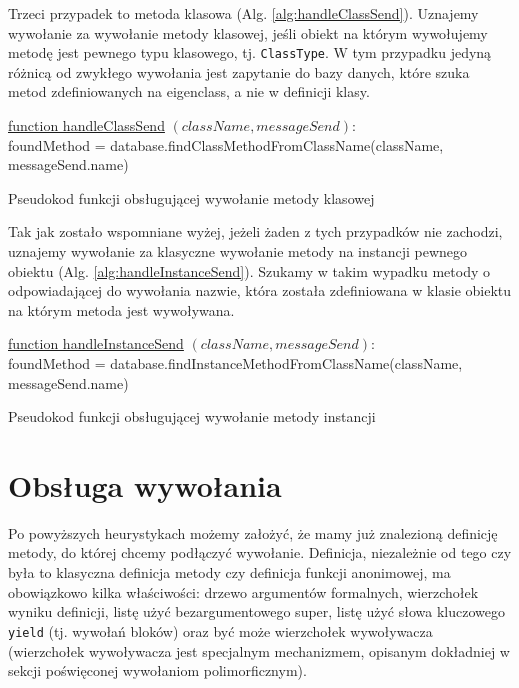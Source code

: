 \documentclass[declaration,shortabstract,mgr]{iithesis}
\newcommand{\algsize}{\small}
\begin{document}
Trzeci przypadek to metoda klasowa (Alg. \ref{alg:handleClassSend}). Uznajemy wywołanie za wywołanie metody klasowej, jeśli obiekt na którym wywołujemy metodę jest pewnego typu klasowego, tj. \texttt{ClassType}. W tym przypadku jedyną różnicą od zwykłego wywołania jest zapytanie do bazy danych, które szuka metod zdefiniowanych na eigenclass, a nie w definicji klasy.

\begin{algorithm}
    \algsize
    \underline{function handleClassSend} $(\mathit{className}, \mathit{messageSend})$:\\
    foundMethod = database.findClassMethodFromClassName(className, messageSend.name)\;
    \caption{Pseudokod funkcji obsługującej wywołanie metody klasowej}
    \label{alg:handleClassSend}
\end{algorithm}

Tak jak zostało wspomniane wyżej, jeżeli żaden z tych przypadków nie zachodzi, uznajemy wywołanie za klasyczne wywołanie metody na instancji pewnego obiektu (Alg. \ref{alg:handleInstanceSend}). Szukamy w takim wypadku metody o odpowiadającej do wywołania nazwie, która została zdefiniowana w klasie obiektu na którym metoda jest wywoływana.

\begin{algorithm}
    \algsize
    \underline{function handleInstanceSend} $(\mathit{className}, \mathit{messageSend})$:\\
    foundMethod = database.findInstanceMethodFromClassName(className, messageSend.name)\;
    \caption{Pseudokod funkcji obsługującej wywołanie metody instancji}
    \label{alg:handleInstanceSend}
\end{algorithm}

\section{Obsługa wywołania}

Po powyższych heurystykach możemy założyć, że mamy już znalezioną definicję metody, do której chcemy podłączyć wywołanie. Definicja, niezależnie od tego czy była to klasyczna definicja metody czy definicja funkcji anonimowej, ma obowiązkowo kilka właściwości: drzewo argumentów formalnych, wierzchołek wyniku definicji, listę użyć bezargumentowego super, listę użyć słowa kluczowego \texttt{yield} (tj. wywołań bloków) oraz być może wierzchołek wywoływacza (wierzchołek wywoływacza jest specjalnym mechanizmem, opisanym dokładniej w sekcji poświęconej wywołaniom polimorficznym).
\end{document}
